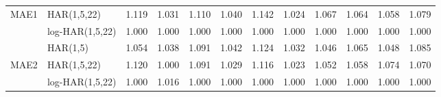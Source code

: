 \begin{table}[ht]
{\begin{tabular}{llrrrrrrrrrr}
  MAE1 & HAR(1,5,22) & 1.119 & 1.031 & 1.110 & 1.040 & 1.142 & 1.024 & 1.067 & 1.064 & 1.058 & 1.079 \\ 
   & log-HAR(1,5,22) & 1.000 & 1.000 & 1.000 & 1.000 & 1.000 & 1.000 & 1.000 & 1.000 & 1.000 & 1.000 \\ 
   \hline
 & HAR(1,5) & 1.054 & 1.038 & 1.091 & 1.042 & 1.124 & 1.032 & 1.046 & 1.065 & 1.048 & 1.085 \\ 
  MAE2 & HAR(1,5,22) & 1.120 & 1.000 & 1.091 & 1.029 & 1.116 & 1.023 & 1.052 & 1.058 & 1.074 & 1.070 \\ 
   & log-HAR(1,5,22) & 1.000 & 1.016 & 1.000 & 1.000 & 1.000 & 1.000 & 1.000 & 1.000 & 1.000 & 1.000 \\ 
   \hline
\end{tabular}
}
\end{table}
